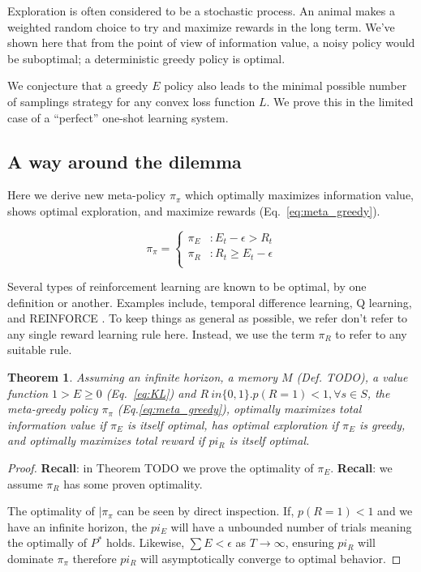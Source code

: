\documentclass[9pt,twocolumn,twoside]{pnas-new}
\newtheorem{theorem}{Theorem}
\begin{document}
Exploration is often considered to be a stochastic process. An animal makes a weighted random choice to try and maximize rewards in the long term. We've shown here that from the point of view of information value, a noisy policy would be suboptimal; a deterministic greedy policy is optimal.

We conjecture that a greedy $E$ policy also leads to the minimal possible number of samplings strategy for any convex loss function $L$. We prove this in the limited case of a ``perfect'' one-shot learning system.


\subsection*{A way around the dilemma}
Here we derive new meta-policy $\pi_{\pi}$ which optimally maximizes information value, shows optimal exploration, and maximize rewards (Eq.~\ref{eq:meta_greedy}).

\begin{equation}
    \pi_{\pi} = 
    \begin{cases}
        \pi_E & : E_t - \epsilon > R_t \\
        \pi_R & : R_t \geq E_t - \epsilon \\
    \end{cases}
    \label{eq:meta_greedy}
\end{equation}

Several types of reinforcement learning are known to be optimal, by one definition or another. Examples include, temporal difference learning, Q learning, and REINFORCE \cite{Sutton2018}. To keep things as general as possible, we refer don't refer to any single reward learning rule here. Instead, we use the term $\pi_R$ to refer to any suitable rule.

\begin{theorem}
    Assuming an infinite horizon, a memory $M$ (Def. TODO), a value function $1 > E \ge 0$ (Eq.~\ref{eq:KL}) and $R\ in \{0, 1\}. p(R = 1) < 1, \forall s \in S$, the \textit{meta-greedy} policy $\pi_{\pi}$ (Eq.\ref{eq:meta_greedy}), optimally maximizes total information value if $\pi_E$ is itself optimal, has optimal exploration if $\pi_E$ is greedy, and optimally maximizes total reward if $pi_R$ is itself optimal.
\end{theorem}
\begin{proof}
    \textbf{Recall}: in Theorem TODO we prove the optimality of $\pi_E$.
    \textbf{Recall}: we assume $\pi_R$ has some proven optimality.

    The optimality of $|\pi_{\pi}$ can be seen by direct inspection. If, $p(R = 1) < 1$ and we have an infinite horizon, the $pi_E$ will have a unbounded number of trials meaning the optimally of $P^*$ holds. Likewise, $\sum E < \epsilon$ as $T \rightarrow \infty$, ensuring $pi_R$ will dominate $\pi_{\pi}$ therefore $pi_R$ will asymptotically converge to optimal behavior.
\end{proof}
\end{document}
